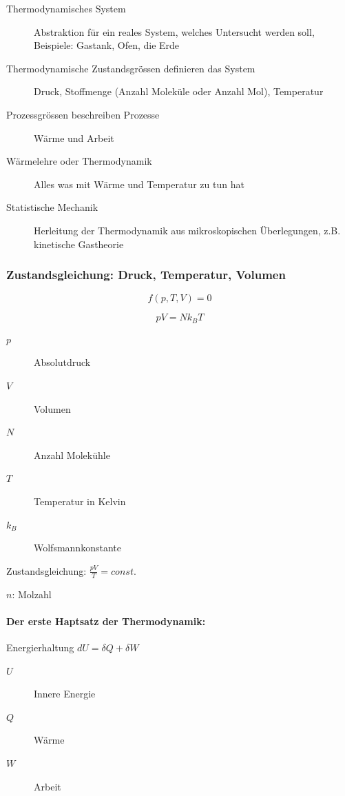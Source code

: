 \documentclass[a4paper]{scrartcl}
\begin{document}
\begin{description}
	\item[Thermodynamisches System] Abstraktion für ein reales System, welches Untersucht werden soll, Beispiele: Gastank, Ofen, die Erde
	\item[Thermodynamische Zustandsgrössen definieren das System] Druck, Stoffmenge (Anzahl Moleküle oder Anzahl Mol), Temperatur
	\item[Prozessgrössen beschreiben Prozesse] Wärme und Arbeit
	\item[Wärmelehre oder Thermodynamik] Alles was mit Wärme und Temperatur zu tun hat
	\item[Statistische Mechanik] Herleitung der Thermodynamik aus mikroskopischen Überlegungen, z.B. kinetische Gastheorie
\end{description}


\subsubsection{Zustandsgleichung: Druck, Temperatur, Volumen}


\[
	f(p, T, V) = 0
\]



\[
p V = N k_B T
\]


\begin{description}
	\item[$p$] Absolutdruck
	\item[$V$] Volumen	
	\item[$N$] Anzahl Molekühle
	\item[$T$] Temperatur in Kelvin
	\item[$k_B$] Wolfsmannkonstante
\end{description}

Zustandsgleichung: $\frac{pV}{T} = const.$



$n$: Molzahl





\paragraph{Der erste Haptsatz der Thermodynamik:}

Energierhaltung $dU = \delta Q + \delta W$

\begin{description}
	\item[$U$] Innere Energie
	\item[$Q$] Wärme
	\item[$W$] Arbeit
\end{description}
\end{document}
